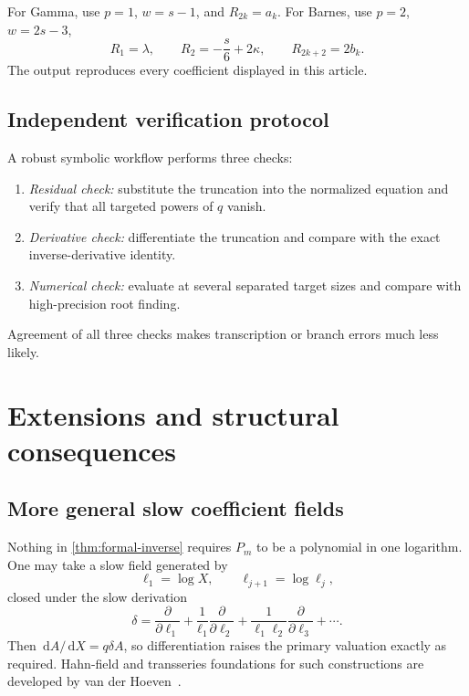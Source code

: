 \documentclass[11pt,a4paper]{article}
\numberwithin{equation}{section}
\theoremstyle{definition}
\theoremstyle{remark}
\newcommand{\dd}{\,\mathrm d}
\begin{document}
For Gamma, use \(p=1\), \(w=s-1\), and
\(R_{2k}=a_k\).  For Barnes, use \(p=2\),
\(w=2s-3\),
\begin{equation}
 R_1=\lambda,
 \qquad R_2=-\frac{s}{6}+2\kappa,
 \qquad R_{2k+2}=2b_k.
 \label{eq:R-concrete}
\end{equation}
The output reproduces every coefficient displayed in this article.

\subsection{Independent verification protocol}

A robust symbolic workflow performs three checks:
\begin{enumerate}
\item \emph{Residual check:} substitute the truncation into the normalized
      equation and verify that all targeted powers of \(q\) vanish.
\item \emph{Derivative check:} differentiate the truncation and compare
      with the exact inverse-derivative identity.
\item \emph{Numerical check:} evaluate at several separated target sizes
      and compare with high-precision root finding.
\end{enumerate}
Agreement of all three checks makes transcription or branch errors much
less likely.

\section{Extensions and structural consequences}

\subsection{More general slow coefficient fields}

Nothing in \cref{thm:formal-inverse} requires \(P_m\) to be a polynomial in
one logarithm.  One may take a slow field generated by
\begin{equation}
 \ell_1=\log X,
 \qquad \ell_{j+1}=\log\ell_j,
 \label{eq:iterated-logs}
\end{equation}
closed under the slow derivation
\begin{equation}
 \delta=
 \frac{\partial}{\partial\ell_1}
 +\frac1{\ell_1}\frac{\partial}{\partial\ell_2}
 +\frac1{\ell_1\ell_2}\frac{\partial}{\partial\ell_3}+\cdots.
 \label{eq:slow-derivation}
\end{equation}
Then \(\dd A/\dd X=q\delta A\), so differentiation raises the primary
valuation exactly as required.  Hahn-field and transseries foundations for
such constructions are developed by van der Hoeven~\cite{vanDerHoeven}.
\end{document}
